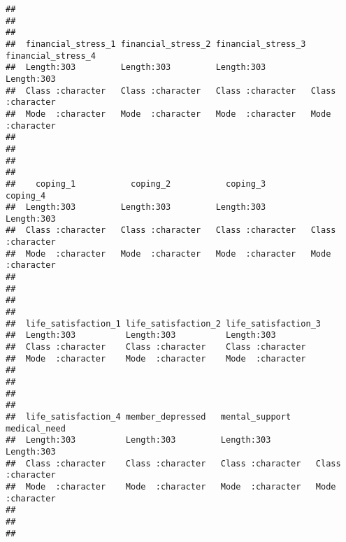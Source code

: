 \documentclass[
]{article}
\begin{document}
\begin{verbatim}
##                                                                                
##                                                                                
##                                                                                
##  financial_stress_1 financial_stress_2 financial_stress_3 financial_stress_4
##  Length:303         Length:303         Length:303         Length:303        
##  Class :character   Class :character   Class :character   Class :character  
##  Mode  :character   Mode  :character   Mode  :character   Mode  :character  
##                                                                             
##                                                                             
##                                                                             
##                                                                             
##    coping_1           coping_2           coping_3           coping_4        
##  Length:303         Length:303         Length:303         Length:303        
##  Class :character   Class :character   Class :character   Class :character  
##  Mode  :character   Mode  :character   Mode  :character   Mode  :character  
##                                                                             
##                                                                             
##                                                                             
##                                                                             
##  life_satisfaction_1 life_satisfaction_2 life_satisfaction_3
##  Length:303          Length:303          Length:303         
##  Class :character    Class :character    Class :character   
##  Mode  :character    Mode  :character    Mode  :character   
##                                                             
##                                                             
##                                                             
##                                                             
##  life_satisfaction_4 member_depressed   mental_support     medical_need      
##  Length:303          Length:303         Length:303         Length:303        
##  Class :character    Class :character   Class :character   Class :character  
##  Mode  :character    Mode  :character   Mode  :character   Mode  :character  
##                                                                              
##                                                                              
##                                                                              

\end{verbatim}
\end{document}
